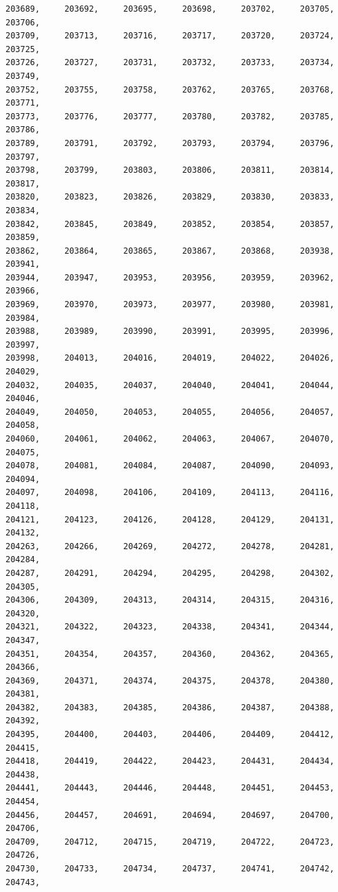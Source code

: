 \documentclass[a4paper,11pt]{report}
\begin{document}
\begin{verbatim}
203689,     203692,     203695,     203698,     203702,     203705,     203706,
203709,     203713,     203716,     203717,     203720,     203724,     203725,
203726,     203727,     203731,     203732,     203733,     203734,     203749,
203752,     203755,     203758,     203762,     203765,     203768,     203771,
203773,     203776,     203777,     203780,     203782,     203785,     203786,
203789,     203791,     203792,     203793,     203794,     203796,     203797,
203798,     203799,     203803,     203806,     203811,     203814,     203817,
203820,     203823,     203826,     203829,     203830,     203833,     203834,
203842,     203845,     203849,     203852,     203854,     203857,     203859,
203862,     203864,     203865,     203867,     203868,     203938,     203941,
203944,     203947,     203953,     203956,     203959,     203962,     203966,
203969,     203970,     203973,     203977,     203980,     203981,     203984,
203988,     203989,     203990,     203991,     203995,     203996,     203997,
203998,     204013,     204016,     204019,     204022,     204026,     204029,
204032,     204035,     204037,     204040,     204041,     204044,     204046,
204049,     204050,     204053,     204055,     204056,     204057,     204058,
204060,     204061,     204062,     204063,     204067,     204070,     204075,
204078,     204081,     204084,     204087,     204090,     204093,     204094,
204097,     204098,     204106,     204109,     204113,     204116,     204118,
204121,     204123,     204126,     204128,     204129,     204131,     204132,
204263,     204266,     204269,     204272,     204278,     204281,     204284,
204287,     204291,     204294,     204295,     204298,     204302,     204305,
204306,     204309,     204313,     204314,     204315,     204316,     204320,
204321,     204322,     204323,     204338,     204341,     204344,     204347,
204351,     204354,     204357,     204360,     204362,     204365,     204366,
204369,     204371,     204374,     204375,     204378,     204380,     204381,
204382,     204383,     204385,     204386,     204387,     204388,     204392,
204395,     204400,     204403,     204406,     204409,     204412,     204415,
204418,     204419,     204422,     204423,     204431,     204434,     204438,
204441,     204443,     204446,     204448,     204451,     204453,     204454,
204456,     204457,     204691,     204694,     204697,     204700,     204706,
204709,     204712,     204715,     204719,     204722,     204723,     204726,
204730,     204733,     204734,     204737,     204741,     204742,     204743,

\end{verbatim}
\end{document}
